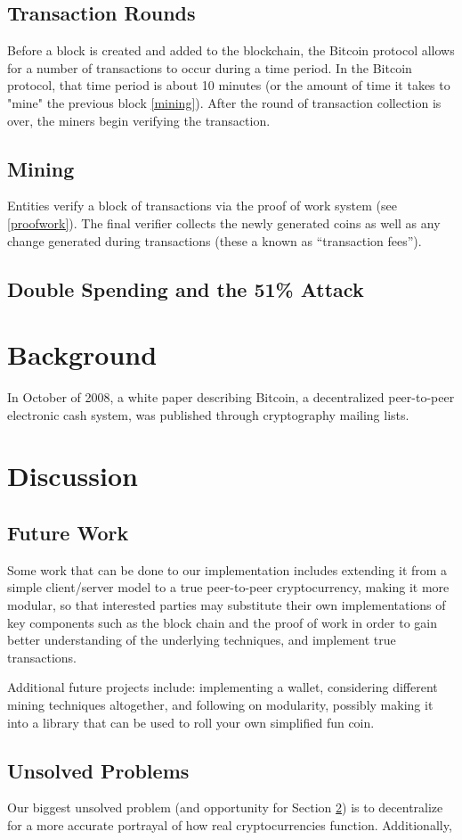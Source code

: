 \documentclass[12pt]{article}
\begin{document}
\subsection{Transaction Rounds}
Before a block is created and added to the blockchain, the Bitcoin protocol allows for a number of transactions to occur
during a time period. In the Bitcoin protocol, that time period is about 10 minutes (or the amount of time it takes to "mine" the previous block \ref{mining}). After the round of
transaction collection is over, the miners begin verifying the transaction.

\subsection{Mining}
Entities verify a block of transactions via the proof of work system (see \ref{proofwork}).
The final verifier collects the newly generated coins as well as any change generated during
transactions (these a known as ``transaction fees''). 

\subsection{Double Spending and the 51\% Attack}\label{doublespend}

\section{Background}
In October of 2008, a white paper\cite{nakamoto:bitcoin} describing Bitcoin, a decentralized peer-to-peer electronic cash system, was published through cryptography mailing lists.


\section{Discussion}\label{future}
\subsection{Future Work}\label{work}
Some work that can be done to our implementation includes extending it from a simple client/server model to a true peer-to-peer cryptocurrency, making it more modular, so that interested parties may substitute their own implementations of key components such as the block chain and the proof of work in order to gain better understanding of the underlying techniques, and implement true transactions. 

Additional future projects include: implementing a wallet, considering different mining techniques altogether, and following on modularity, possibly making it into a library that can be used to roll your own simplified fun coin.

\subsection{Unsolved Problems}\label{unsolved}
Our biggest unsolved problem (and opportunity for Section \ref{future}) is to decentralize for a more accurate portrayal of how real cryptocurrencies function. Additionally, 



\end{document}

